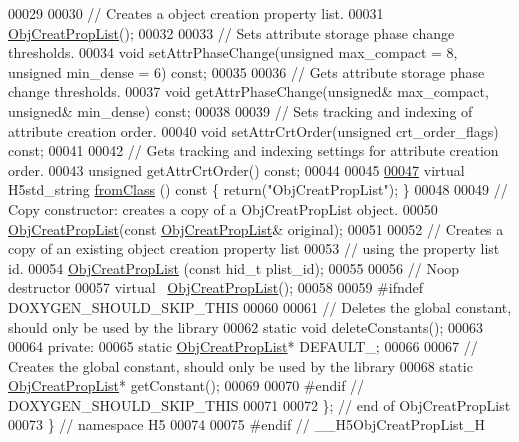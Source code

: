 \begin{DoxyCode}
00029 
00030         \textcolor{comment}{// Creates a object creation property list.}
00031         \hyperlink{class_h5_1_1_obj_creat_prop_list}{ObjCreatPropList}();
00032 
00033         \textcolor{comment}{// Sets attribute storage phase change thresholds.}
00034         \textcolor{keywordtype}{void} setAttrPhaseChange(\textcolor{keywordtype}{unsigned} max\_compact = 8, \textcolor{keywordtype}{unsigned} min\_dense = 6) \textcolor{keyword}{const};
00035 
00036         \textcolor{comment}{// Gets attribute storage phase change thresholds.}
00037         \textcolor{keywordtype}{void} getAttrPhaseChange(\textcolor{keywordtype}{unsigned}& max\_compact, \textcolor{keywordtype}{unsigned}& min\_dense) \textcolor{keyword}{const};
00038 
00039         \textcolor{comment}{// Sets tracking and indexing of attribute creation order.}
00040         \textcolor{keywordtype}{void} setAttrCrtOrder(\textcolor{keywordtype}{unsigned} crt\_order\_flags) \textcolor{keyword}{const};
00041 
00042         \textcolor{comment}{// Gets tracking and indexing settings for attribute creation order.}
00043         \textcolor{keywordtype}{unsigned} getAttrCrtOrder() \textcolor{keyword}{const};
00044 
00045 
\hyperlink{class_h5_1_1_obj_creat_prop_list_aa9e5e054947c19ae8eaab5e4e938fc2c}{00047}         \textcolor{keyword}{virtual} H5std\_string \hyperlink{class_h5_1_1_obj_creat_prop_list_aa9e5e054947c19ae8eaab5e4e938fc2c}{fromClass} ()\textcolor{keyword}{ const }\{ \textcolor{keywordflow}{return}(\textcolor{stringliteral}{"ObjCreatPropList"}); \}
00048 
00049         \textcolor{comment}{// Copy constructor: creates a copy of a ObjCreatPropList object.}
00050         \hyperlink{class_h5_1_1_obj_creat_prop_list}{ObjCreatPropList}(\textcolor{keyword}{const} \hyperlink{class_h5_1_1_obj_creat_prop_list}{ObjCreatPropList}& original);
00051 
00052         \textcolor{comment}{// Creates a copy of an existing object creation property list}
00053         \textcolor{comment}{// using the property list id.}
00054         \hyperlink{class_h5_1_1_obj_creat_prop_list}{ObjCreatPropList} (\textcolor{keyword}{const} hid\_t plist\_id);
00055 
00056         \textcolor{comment}{// Noop destructor}
00057         \textcolor{keyword}{virtual} ~\hyperlink{class_h5_1_1_obj_creat_prop_list}{ObjCreatPropList}();
00058 
00059 \textcolor{preprocessor}{#ifndef DOXYGEN\_SHOULD\_SKIP\_THIS}
00060 
00061         \textcolor{comment}{// Deletes the global constant, should only be used by the library}
00062         \textcolor{keyword}{static} \textcolor{keywordtype}{void} deleteConstants();
00063 
00064     \textcolor{keyword}{private}:
00065         \textcolor{keyword}{static} \hyperlink{class_h5_1_1_obj_creat_prop_list}{ObjCreatPropList}* DEFAULT\_;
00066 
00067         \textcolor{comment}{// Creates the global constant, should only be used by the library}
00068         \textcolor{keyword}{static} \hyperlink{class_h5_1_1_obj_creat_prop_list}{ObjCreatPropList}* getConstant();
00069 
00070 \textcolor{preprocessor}{#endif // DOXYGEN\_SHOULD\_SKIP\_THIS}
00071 
00072 \}; \textcolor{comment}{// end of ObjCreatPropList}
00073 \} \textcolor{comment}{// namespace H5}
00074 
00075 \textcolor{preprocessor}{#endif // \_\_H5ObjCreatPropList\_H}
\end{DoxyCode}
